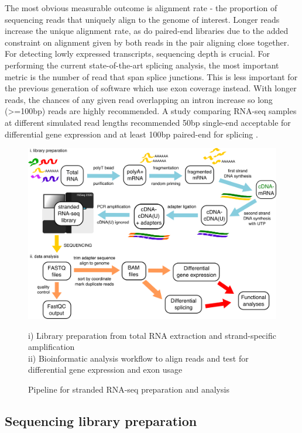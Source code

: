 The most obvious measurable outcome is alignment rate - the proportion of sequencing reads that uniquely align to the genome of interest. 
Longer reads increase the unique alignment rate, as do paired-end libraries due to the added constraint on alignment given by both reads in the pair aligning close together. 
For detecting lowly expressed transcripts, sequencing depth is crucial. 
For performing the current state-of-the-art splicing analysis, the most important metric is the number of read that span splice junctions. 
This is less important for the previous generation of software which use exon coverage instead.
With longer reads, the chances of any given read overlapping an intron increase so long (>=100bp) reads are highly recommended.
A study comparing RNA-seq samples at different simulated read lengths recommended 50bp single-end acceptable for differential gene expression and at least 100bp paired-end for splicing \citep{Chhangawala2015}. %


\begin{figure}[h!]
	\begin{center}
		\includegraphics[width=14cm]{Figures/02_methods/RNAseq_pipeline_schematic.png}
	\end{center}
	\caption{Pipeline for stranded RNA-seq preparation and analysis}
	i) Library preparation from total RNA extraction and strand-specific amplification\\
	ii) Bioinformatic analysis workflow to align reads and test for differential gene expression and exon usage
\end{figure}

\subsection{Sequencing library preparation}

